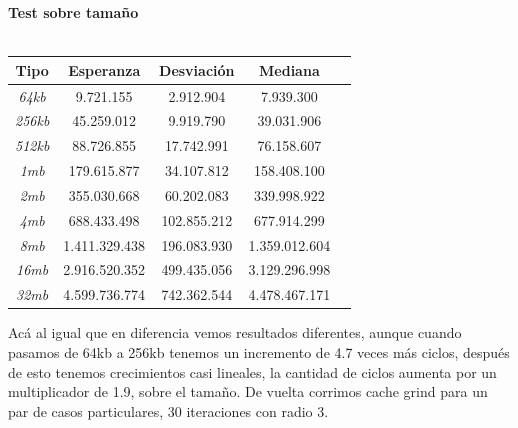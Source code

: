 \documentclass[a4paper]{article}
\begin{document}
\newpage
\begin{center}
          \textbf{Test sobre tamaño}  \\ 
          \hfill \\
        \begin{tabular}[c]{|c|c|c|c|c|}
        \hline
      \textbf{Tipo}  & \textbf{Esperanza} & \textbf{Desviación} & \textbf{Mediana}\\
          	\hline
\textit{64kb} &	9.721.155 & 2.912.904 & 7.939.300 \\
		\hline

\textit{256kb} &	45.259.012 & 9.919.790 & 39.031.906 \\
		\hline
\textit{512kb} &	88.726.855 & 17.742.991 & 76.158.607 \\
		\hline
\textit{1mb} &	179.615.877 & 34.107.812 & 158.408.100  \\
		\hline
\textit{2mb} &	355.030.668 & 60.202.083 & 339.998.922  \\
		\hline
\textit{4mb} &	688.433.498 & 102.855.212 & 677.914.299  \\
		\hline
\textit{8mb} &	1.411.329.438 & 196.083.930 & 1.359.012.604  \\
		\hline
\textit{16mb} & 2.916.520.352 & 499.435.056 & 3.129.296.998  \\
		\hline
\textit{32mb} &	4.599.736.774 & 742.362.544 & 4.478.467.171  \\
		\hline

	\end{tabular}
\end{center}

Acá al igual que en diferencia vemos resultados diferentes, aunque cuando pasamos de 64kb a 256kb tenemos un incremento de 4.7 veces más ciclos, después de esto tenemos crecimientos casi lineales, la cantidad de ciclos aumenta por un multiplicador de 1.9, sobre el tamaño. De vuelta corrimos cache grind para un par de casos particulares, 30 iteraciones con radio 3. 
\end{document}
